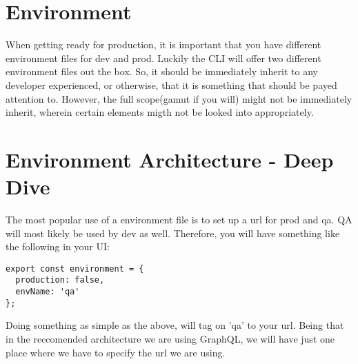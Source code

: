 \maketitle{}
\section{ Environment }

When getting ready for production, it is important that you have different
environment files for dev and prod. Luckily the CLI will offer two different
environment files out the box. So, it should be immediately inherit to any
developer experienced, or otherwise, that it is something that should be payed
attention to. However, the full scope(gamut if you will) might not be
immediately inherit, wherein certain elements migth not be looked into
appropriately.

\section{ Environment Architecture - Deep Dive}
The most popular use of a environment file is to set up a url for prod and qa.
QA will most likely be used by dev as well. Therefore, you will have something
like the following in your UI:
\begin{lstlisting}
export const environment = {
  production: false,
  envName: 'qa'
};
\end{lstlisting}

Doing something as simple as the above, will tag on 'qa' to your url. Being that
in the reccomended architecture we are using GraphQL, we will have just one
place where we have to specify the url we are using. 
